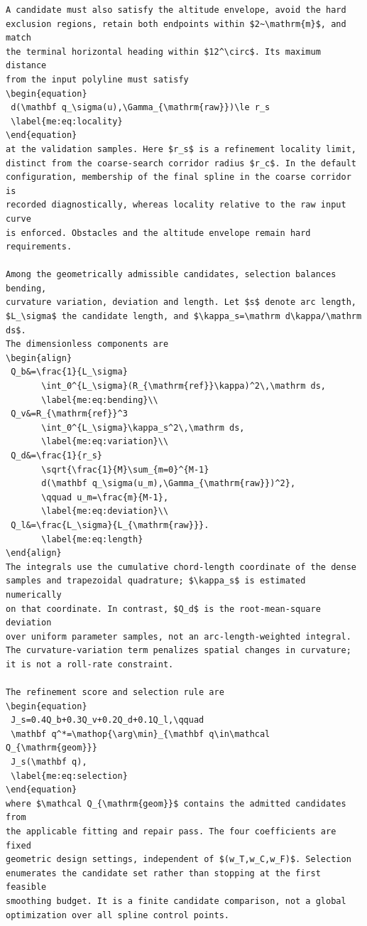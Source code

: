 \documentclass[12pt]{article}
\begin{document}
\begin{verbatim}
A candidate must also satisfy the altitude envelope, avoid the hard
exclusion regions, retain both endpoints within $2~\mathrm{m}$, and match
the terminal horizontal heading within $12^\circ$. Its maximum distance
from the input polyline must satisfy
\begin{equation}
 d(\mathbf q_\sigma(u),\Gamma_{\mathrm{raw}})\le r_s
 \label{me:eq:locality}
\end{equation}
at the validation samples. Here $r_s$ is a refinement locality limit,
distinct from the coarse-search corridor radius $r_c$. In the default
configuration, membership of the final spline in the coarse corridor is
recorded diagnostically, whereas locality relative to the raw input curve
is enforced. Obstacles and the altitude envelope remain hard requirements.

Among the geometrically admissible candidates, selection balances bending,
curvature variation, deviation and length. Let $s$ denote arc length,
$L_\sigma$ the candidate length, and $\kappa_s=\mathrm d\kappa/\mathrm ds$.
The dimensionless components are
\begin{align}
 Q_b&=\frac{1}{L_\sigma}
       \int_0^{L_\sigma}(R_{\mathrm{ref}}\kappa)^2\,\mathrm ds,
       \label{me:eq:bending}\\
 Q_v&=R_{\mathrm{ref}}^3
       \int_0^{L_\sigma}\kappa_s^2\,\mathrm ds,
       \label{me:eq:variation}\\
 Q_d&=\frac{1}{r_s}
       \sqrt{\frac{1}{M}\sum_{m=0}^{M-1}
       d(\mathbf q_\sigma(u_m),\Gamma_{\mathrm{raw}})^2},
       \qquad u_m=\frac{m}{M-1},
       \label{me:eq:deviation}\\
 Q_l&=\frac{L_\sigma}{L_{\mathrm{raw}}}.
       \label{me:eq:length}
\end{align}
The integrals use the cumulative chord-length coordinate of the dense
samples and trapezoidal quadrature; $\kappa_s$ is estimated numerically
on that coordinate. In contrast, $Q_d$ is the root-mean-square deviation
over uniform parameter samples, not an arc-length-weighted integral.
The curvature-variation term penalizes spatial changes in curvature;
it is not a roll-rate constraint.

The refinement score and selection rule are
\begin{equation}
 J_s=0.4Q_b+0.3Q_v+0.2Q_d+0.1Q_l,\qquad
 \mathbf q^*=\mathop{\arg\min}_{\mathbf q\in\mathcal Q_{\mathrm{geom}}}
 J_s(\mathbf q),
 \label{me:eq:selection}
\end{equation}
where $\mathcal Q_{\mathrm{geom}}$ contains the admitted candidates from
the applicable fitting and repair pass. The four coefficients are fixed
geometric design settings, independent of $(w_T,w_C,w_F)$. Selection
enumerates the candidate set rather than stopping at the first feasible
smoothing budget. It is a finite candidate comparison, not a global
optimization over all spline control points.


\end{verbatim}
\end{document}
